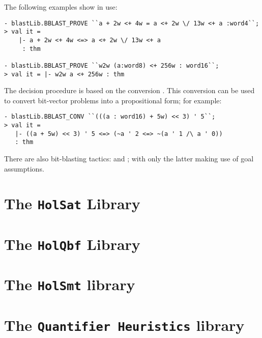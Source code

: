 The following examples show  in use:
\begin{session}
\begin{verbatim}
- blastLib.BBLAST_PROVE ``a + 2w <+ 4w = a <+ 2w \/ 13w <+ a :word4``;
> val it =
    |- a + 2w <+ 4w <=> a <+ 2w \/ 13w <+ a
     : thm

- blastLib.BBLAST_PROVE ``w2w (a:word8) <+ 256w : word16``;
> val it = |- w2w a <+ 256w : thm
\end{verbatim}
\end{session}
The decision procedure  is based on the conversion
. This conversion can be used to convert bit-vector problems
into a propositional form; for example:
\begin{session}
\begin{verbatim}
- blastLib.BBLAST_CONV ``(((a : word16) + 5w) << 3) ' 5``;
> val it =
   |- ((a + 5w) << 3) ' 5 <=> (~a ' 2 <=> ~(a ' 1 /\ a ' 0))
   : thm
\end{verbatim}
\end{session}
There are also bit-blasting tactics:  and ; with only the latter making use of goal assumptions.

\section{The \texttt{HolSat} Library}\label{sec:HolSatLib}



\section{The \texttt{HolQbf} Library}\label{sec:HolQbfLib}



\section{The \texttt{HolSmt} library}\label{sec:HolSmtLib}


\section{The \texttt{Quantifier Heuristics} library}\label{sec:QuantHeuristicsLib}



